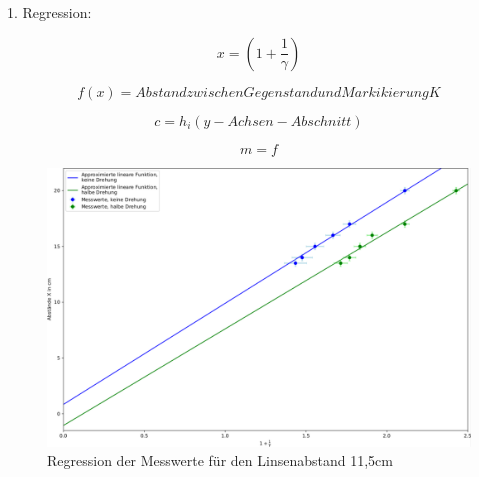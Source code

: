 1. Regression:

\begin{equation} \label{x}
    x = (1 + \frac{1}{\gamma})
\end{equation}

\begin{equation} \label{h}
    f(x) = Abstand zwischen Gegenstand und Markikierung K
\end{equation}

\begin{equation} \label{h}
    c = h_i (y-Achsen-Abschnitt)
\end{equation}

\begin{equation} \label{h}
    m = f
\end{equation}

\begin{figure}[h!]{}
    \begin{center}
        \includegraphics[scale=0.4]{./Protokoll/fig/Abbe_Reg_Messreihe1_Plot.pdf}
        \caption{Regression der Messwerte für den Linsenabstand 11,5cm}
        \label{fig:Abbe-Regress-S1}
    \end{center}
\end{figure}

